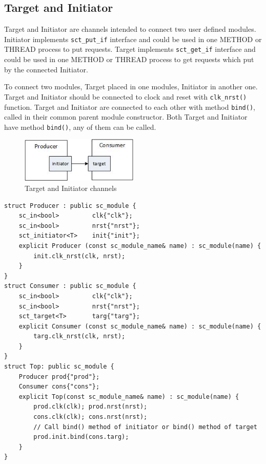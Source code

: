 \subsection{Target and Initiator}\label{section:sct_targ_init}

Target and Initiator are channels intended to connect two user defined modules. Initiator implements {\tt sct\_put\_if} interface and could be used in one METHOD or THREAD process to put requests. Target implements {\tt sct\_get\_if} interface and could be used in one METHOD or THREAD process to get requests which put by the connected Initiator.

To connect two modules, Target placed in one modules, Initiator in another one. Target and Initiator should be connected to clock and reset with {\tt clk\_nrst()} function. Target and Initiator are connected to each other with method {\tt bind()}, called in their common parent module constructor. Both Target and Initiator have method {\tt bind()}, any of them can be called.

\begin{figure}[!htb]
\centering
\includegraphics[width=0.5\textwidth]{pics/ss_targ_init.jpg}
\caption{Target and Initiator channels}
\label{fig:ss_usage}
\end{figure}

\begin{lstlisting}[style=mycpp]
struct Producer : public sc_module {
    sc_in<bool>         clk{"clk"};
    sc_in<bool>         nrst{"nrst"};
    sct_initiator<T>    init{"init"};
    explicit Producer (const sc_module_name& name) : sc_module(name) {
        init.clk_nrst(clk, nrst);
    } 
}
struct Consumer : public sc_module {
    sc_in<bool>         clk{"clk"};
    sc_in<bool>         nrst{"nrst"};
    sct_target<T>       targ{"targ"};
    explicit Consumer (const sc_module_name& name) : sc_module(name) {
        targ.clk_nrst(clk, nrst);
    } 
}
struct Top: public sc_module {
    Producer prod{"prod"};
    Consumer cons{"cons"};
    explicit Top(const sc_module_name& name) : sc_module(name) {
        prod.clk(clk); prod.nrst(nrst);
        cons.clk(clk); cons.nrst(nrst);
        // Call bind() method of initiator or bind() method of target
        prod.init.bind(cons.targ);  
    }
}
\end{lstlisting}

